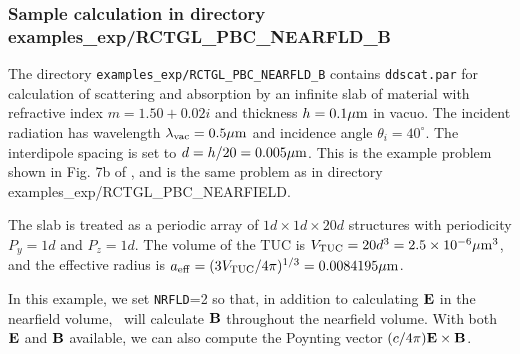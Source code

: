 \subsubsection{\bf Sample calculation in directory 
               examples\_exp/RCTGL\_PBC\_NEARFLD\_B}

The directory {\tt examples\_exp/RCTGL\_PBC\_NEARFLD\_B} contains
{\tt ddscat.par} for calculation of scattering and absorption by
an infinite slab of material with refractive index $m=1.50+0.02i$ and
thickness $h=0.1{\mu{\rm m}}$ in
vacuo.  The incident radiation has wavelength $\lambda_{\rm vac}=0.5{\mu{\rm m}}$
and incidence angle $\theta_i=40^\circ$.
The interdipole spacing is set to $d=h/20 = 0.005{\mu{\rm m}}$.
This is the example problem shown in Fig. 7b of \citet{Draine+Flatau_2008a},
and is the same problem as in directory examples\_exp/RCTGL\_PBC\_NEARFIELD.

The slab is treated as a periodic array of $1d\times1d\times20d$ structures
with periodicity $P_y=1d$ and $P_z=1d$.
The volume of the TUC is $V_{\rm TUC}=20d^3=2.5\times10^{-6}{\mu{\rm m}}^3$,
and the effective radius is
${a}_{\rm eff}=(3V_{\rm TUC}/4\pi)^{1/3}=0.0084195{\mu{\rm m}}$. 

In this example, we set 
{\tt NRFLD}=2 so that, 
in addition to calculating ${\bf E}$ in the nearfield volume,
\ddscatv\ will calculate ${\bf B}$ throughout the nearfield volume.
With both ${\bf E}$ and ${\bf B}$ available, we can also compute the
Poynting vector $(c/4\pi){\bf E}\times{\bf B}$.

